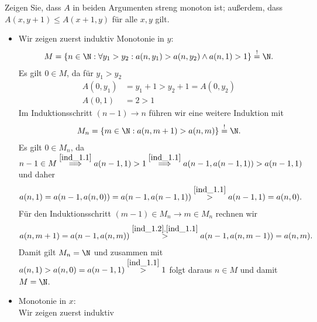 
\begin{exercise}[208]

Zeigen Sie, dass $A$ in beiden Argumenten streng monoton ist; außerdem, dass
$A(x,y+1) \leq A(x+1,y)$ für alle $x,y$ gilt.

\end{exercise}


\begin{solution}
\phantom{}
\begin{itemize}
  \item Wir zeigen zuerst induktiv Monotonie in $y$:
  \begin{align}\label{ind_1.1}
    M = \{n \in \N: \forall y_1 > y_2: a(n,y_1) > a(n,y_2) \land a(n,1) > 1\} \stackrel{!}{=} \N.
  \end{align}
  Es gilt $0 \in M$, da für $y_1 > y_2$
  \begin{align*}
    A(0,y_1) &= y_1 + 1 > y_2 + 1 = A(0,y_2) \\
    A(0,1) &= 2 > 1
  \end{align*}
  Im Induktionsschritt $(n-1) \rightarrow n$ führen wir eine weitere Induktion mit
  \begin{align}\label{ind_1.2}
    M_n = \{m \in \N: a(n,m+1) > a(n,m)\} \stackrel{!}{=} \N.
  \end{align}
  Es gilt $0 \in M_n$, da $n-1 \in M \stackrel{\eqref{ind_1.1}}{\implies}
  a(n-1,1) > 1 \stackrel{\eqref{ind_1.1}}{\implies} a(n-1,a(n-1,1)) > a(n-1,1)$ und daher
  \begin{align*}
    a(n,1) = a(n-1,a(n,0)) = a(n-1,a(n-1,1)) \stackrel{\eqref{ind_1.1}}{>} a(n-1,1) = a(n,0).
  \end{align*}
  Für den Induktionsschritt $(m-1) \in M_n \rightarrow m \in M_n $ rechnen wir
  \begin{align*}
    a(n,m+1) = a(n-1,a(n,m)) \stackrel{\eqref{ind_1.2},\eqref{ind_1.1}}{>} a(n-1,a(n,m-1)) = a(n,m).
  \end{align*}
  Damit gilt $M_n = \N$ und zusammen mit $a(n,1) > a(n,0) = a(n-1,1) \stackrel{\eqref{ind_1.1}}{>} 1$ folgt daraus
  $n \in M$ und damit $M = \N$.
  \item Monotonie in $x$: \\
  Wir zeigen zuerst induktiv
  \begin{align}\label{hilf1}

\end{align}
\end{itemize}
\end{solution}
